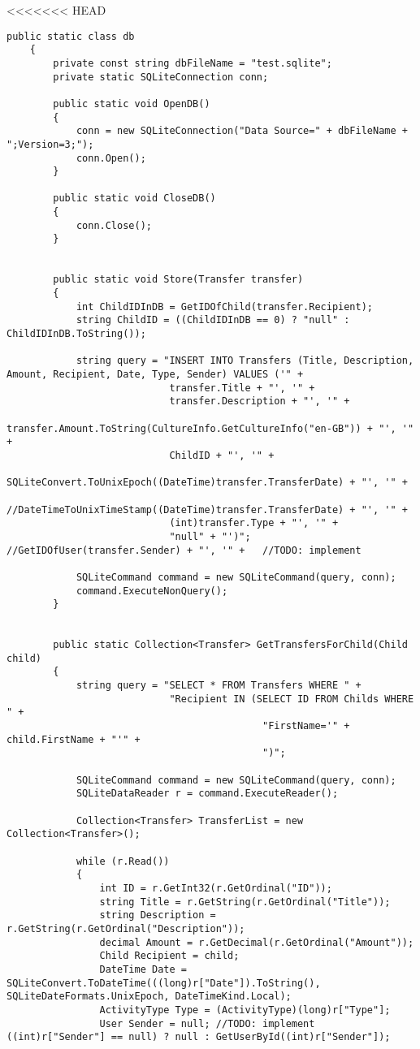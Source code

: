 <<<<<<< HEAD
\begin{lstlisting}[caption={Uddrag af filen "db.cs" fra kildekoden til programmet},label={lst:sqlite}]
    public static class db
    {
        private const string dbFileName = "test.sqlite";
        private static SQLiteConnection conn;

        public static void OpenDB()
        {
            conn = new SQLiteConnection("Data Source=" + dbFileName + ";Version=3;");
            conn.Open();
        }

        public static void CloseDB()
        {
            conn.Close();
        }


        public static void Store(Transfer transfer)
        {
            int ChildIDInDB = GetIDOfChild(transfer.Recipient);
            string ChildID = ((ChildIDInDB == 0) ? "null" : ChildIDInDB.ToString());

            string query = "INSERT INTO Transfers (Title, Description, Amount, Recipient, Date, Type, Sender) VALUES ('" +
                            transfer.Title + "', '" +
                            transfer.Description + "', '" +
                            transfer.Amount.ToString(CultureInfo.GetCultureInfo("en-GB")) + "', '" +
                            ChildID + "', '" +
                            SQLiteConvert.ToUnixEpoch((DateTime)transfer.TransferDate) + "', '" +
                            //DateTimeToUnixTimeStamp((DateTime)transfer.TransferDate) + "', '" +
                            (int)transfer.Type + "', '" +
                            "null" + "')"; //GetIDOfUser(transfer.Sender) + "', '" +   //TODO: implement

            SQLiteCommand command = new SQLiteCommand(query, conn);
            command.ExecuteNonQuery();
        }


        public static Collection<Transfer> GetTransfersForChild(Child child)
        {
            string query = "SELECT * FROM Transfers WHERE " +
                            "Recipient IN (SELECT ID FROM Childs WHERE " +
                                            "FirstName='" + child.FirstName + "'" +
                                            ")";

            SQLiteCommand command = new SQLiteCommand(query, conn);
            SQLiteDataReader r = command.ExecuteReader();

            Collection<Transfer> TransferList = new Collection<Transfer>();

            while (r.Read())
            {
                int ID = r.GetInt32(r.GetOrdinal("ID"));
                string Title = r.GetString(r.GetOrdinal("Title"));
                string Description = r.GetString(r.GetOrdinal("Description"));
                decimal Amount = r.GetDecimal(r.GetOrdinal("Amount"));
                Child Recipient = child;
                DateTime Date = SQLiteConvert.ToDateTime(((long)r["Date"]).ToString(), SQLiteDateFormats.UnixEpoch, DateTimeKind.Local);
                ActivityType Type = (ActivityType)(long)r["Type"];
                User Sender = null; //TODO: implement   ((int)r["Sender"] == null) ? null : GetUserById((int)r["Sender"]);


\end{lstlisting}
